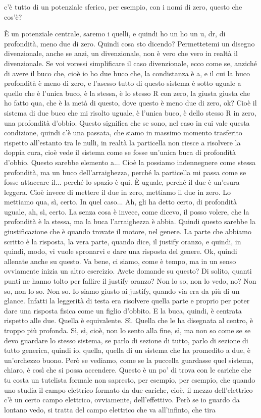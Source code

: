 \begin{soluzione}
{c'è tutto di un potenziale sferico, per esempio, con i nomi di zero, questo che cos'è? 
   
   È un potenziale centrale, saremo i quelli, e quindi ho un ho un u, dr, di profondità, meno due di zero. Quindi cosa sto dicendo? Permettetemi un disegno divenzionale, anche se anzi, un divenzionale, non è vero che vero in realtà il divenzionale. Se voi voressi simplificare il caso divenzionale, ecco come se, anziché di avere il buco che, cioè io ho due buco che, la condistanza è a, e il cui la buco profondità è meno di zero, e l'asesso tutto di questo sistema è sotto uguale a quello che è l'unica buco, è la stessa, è lo stesso R con zero, la giusta giusta che ho fatto qua, che è la metà di questo, dove questo è meno due di zero, ok? Cioè il sistema di due buco che mi risolto uguale, è l'unica buco, è dello stesso R in zero, una profondità d'obbio. Questo significa che se sono, nel caso in cui vale questa condizione, quindi c'è una passata, che siamo in massimo momento trasferito rispetto all'estanto tra le nulli, in realtà la particella non riesce a risolvere la doppia cura, cioè vede il sistema come se fosse un'unica buca di profondità d'obbio. Questo sarebbe elemento a... Cioè la possiamo indennegnere come stessa profondità, ma un buco dell'arraighezza, perché la particella mi passa come se fosse attaccare il... perché lo spazio è qui. È uguale, perché il due è un'esura leggera. Cioè invece di mettere il due in zero, mettiamo il due in zero. Lo mettiamo qua, sì, certo. In quel caso... Ah, gli ha detto certo, di profondità uguale, ah, sì, certo. La senza cosa è invece, come dicevo, il posso volere, che la profondità è la stessa, ma la buca l'arraighezza è abbia. Quindi questo sarebbe la giustificazione che è quando trovate il motore, nel genere. La parte che abbiamo scritto è la risposta, la vera parte, quando dice, il justify oranzo, e quindi, in quindi, modo, vi vuole spronarvi e dare una risposta del genere. Ok, quindi allenate anche su questo. Va bene, ci siamo, come è tempo, ma in un senso ovviamente inizia un altro esercizio. Avete domande su questo? Di solito, quanti punti ne hanno tolto per fallire il justify oranzo? Non lo so, non lo vedo, no? Non so, non lo so. Non so. Io siamo giusto ai justify, quando via era da più di un glance. Infatti la leggerità di testa era risolvere quella parte e proprio per poter dare una risposta fisica come un figlio d'obbito. E la buca, quindi, è centrata rispetto alle due. Quella è equivalente. Sì. Quella che le ha disegnata al centro, è troppo più profonda. Sì, sì, cioè, non lo sento alla fine, sì, ma non so come se se devo guardare lo stesso sistema, se parlo di sezione di tutto, parlo di sezione di tutto generica, quindi io, quella, quella di un sistema che ha promedito a due, è un'orchezzo buono. Però se vediamo, come se la puccella guardasse quel sistema, chiaro, è così che si possa accendere. Questo è un po' di trova con le cariche che tu costa un tutelista formale non sapresto, per esempio, per esempio, che quando uno studia il campo elettrico formato da due cariche, cioè, il mezzo dell'elettrico c'è un certo campo elettrico, ovviamente, dell'effettivo. Però se io guardo da lontano vedo, si tratta del campo elettrico che va all'infinto, che tira }
\end{soluzione}
